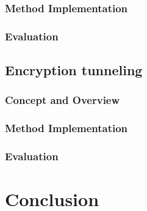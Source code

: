 \documentclass[12pt, fleqn, a4paper]{article}
\begin{document}
% 
% 
% 
% 
% 
% 

\subsubsection{Method Implementation}
\subsubsection{Evaluation}
%
\subsection{Encryption tunneling}
\subsubsection{Concept and Overview}
\subsubsection{Method Implementation}
\subsubsection{Evaluation}
\section*{\centering Conclusion}

%
\end{document}
